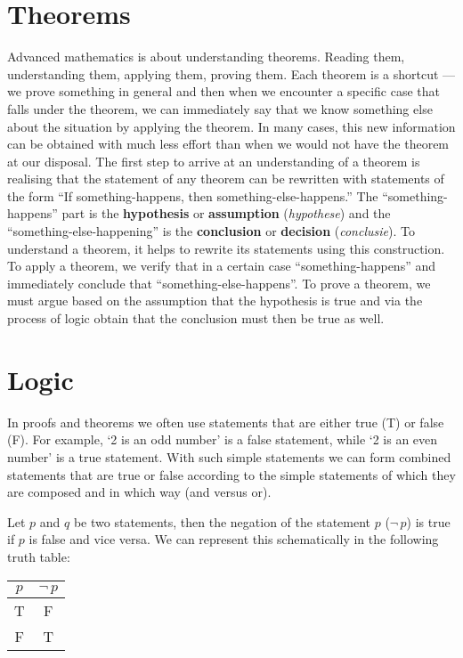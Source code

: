 \section{Theorems}
Advanced mathematics is about understanding theorems. Reading them, understanding them, applying them, proving them. Each theorem is a shortcut --- we prove something in general and then when we encounter a specific case that falls under the theorem, we can immediately say that we know something else about the situation by applying the theorem. In many cases, this new information can be obtained with much less effort than when we would not have the theorem at our disposal.
%
The first step to arrive at an understanding of a theorem is realising that the statement of any theorem can be rewritten with statements of the form ``If something-happens, then something-else-happens.'' The ``something-happens'' part is the \textbf{hypothesis}  or \textbf{assumption}  (\textit{hypothese}) and the ``something-else-happening'' is the \textbf{conclusion}  or \textbf{decision}  (\textit{conclusie}). To understand a theorem, it helps to rewrite its statements using this construction. To apply a theorem, we verify that in a certain case ``something-happens'' and immediately conclude that ``something-else-happens''. To prove a theorem, we must argue based on the assumption that the hypothesis is true and via the process of logic obtain that the conclusion must then be true as well.



\ifanalysis

\section{Logic}
In proofs and theorems we often use statements that are either true (T) or false (F). For example, `2 is an odd number' is a false statement, while `2 is an even number' is a true statement. With such simple statements we can form combined statements that are true or false according to the simple statements of which they are composed and in which way (and versus or).

Let $p$ and $q$ be two statements, then the negation of the statement $p$ ($\neg\,p$) is true if $p$ is false and vice versa. We can represent this schematically in the following truth table:

\begin{center}
\begin{tabular}{c|c}
     $p$& $\neg\, p$  \\\hline
     T&F\\
     F&T
\end{tabular}
\end{center}

